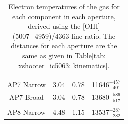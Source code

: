 \begin{table}
\begin{tabular}{cccc}
	&	&	&	\\
	AP7 Narrow   & 3.04                                                        & 0.78                                                     & 11646$^{+457}_{-401}$                                     \\
	AP7 Broad    & 3.04                                                        & 0.78                                                     & 13680$^{+586}_{-517}$                                     \\
	&	&	&	\\
	AP8 Narrow   & 4.48                                                        & 1.15                                                     & 13537$^{+287}_{-282}$                                     \\ 
	\end{tabular}
	\caption[Electron temperatures for the warm ionised gas along the radio axis of IC, measured using the {[}OIII{]}(5007+4959)/4363 line ratio.]{Electron temperatures of the gas for each component in each aperture, derived using the [OIII](5007+4959)/4363 line ratio. The distances for each aperture are the same as given in Table\;\ref{tab: xshooter_ic5063: kinematics}.}
	\label{tab: xshooter_ic5063: temps}
\end{table}

